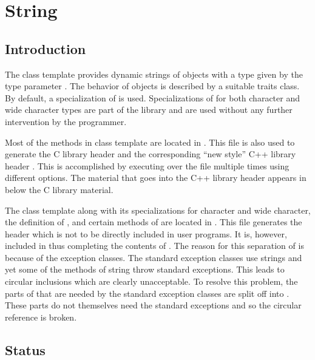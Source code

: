 
\chapter{String}

\section{Introduction}

The class template  provides dynamic strings of objects with
a type given by the type parameter . The behavior of 
objects is described by a suitable traits class. By default, a specialization
of  is used. Specializations of
 for both character and wide character types are part
of the library and are used without any further intervention by the
programmer.

Most of the methods in class template  are located in
. This file is also used to generate the C
library header  and the corresponding ``new style'' C++
library header . This is accomplished by executing
 over the file multiple times using different options. The
material that goes into the C++ library header  appears in
 below the C library material.

The class template  along with its specializations for
character and wide character, the definition of , and
certain methods of  are located in
. This file generates the header
 which is not to be directly included in user programs. It
is, however, included in  thus completing the contents of
. The reason for this separation of  is
because of the exception classes. The standard exception classes use strings
and yet some of the methods of string throw standard exceptions. This leads to
circular inclusions which are clearly unacceptable. To resolve this problem,
the parts of  that are needed by the standard exception
classes are split off into . These parts do not themselves
need the standard exceptions and so the circular reference is broken.

\section{Status}

